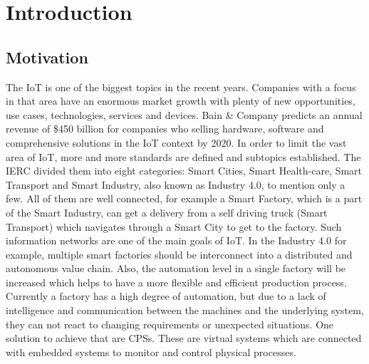 \chapter{Introduction}
\minitoc\vspace{.5cm}

\section{Motivation}

The \ac{IoT} is one of the biggest topics in the recent years.
Companies with a focus in that area have an enormous market growth with plenty of new opportunities, use cases, technologies, services and devices.
Bain \& Company predicts an annual revenue of \$450 billion for companies who selling hardware, software and comprehensive solutions in the \ac{IoT} context by 2020.\autocite{Bosche:2016}
In order to limit the vast area of \ac{IoT}, more and more standards are defined and subtopics established.
The \ac{IERC} divided them into eight categories: Smart Cities, Smart Health-care, Smart Transport and Smart Industry, also known as Industry 4.0, to mention only a few.\autocite[cf.][p. 7]{IERC:2011}
All of them are well connected, for example a Smart Factory, which is a part of the Smart Industry, can get a delivery from a self driving truck (Smart Transport) which navigates through a Smart City to get to the factory.
Such information networks are one of the main goals of \ac{IoT}.
In the Industry 4.0 for example, multiple smart factories should be interconnect into a distributed and autonomous value chain.
Also, the automation level in a single factory will be increased which helps to have a more flexible and efficient production process.
Currently a factory has a high degree of automation, but due to a lack of intelligence and communication between the machines and the underlying system, they can not react to changing requirements or unexpected situations.
One solution to achieve that are \acp{CPS}.
These are virtual systems which are connected with embedded systems to monitor and control physical processes.\autocite[cf.][p. 363]{Lee:2008}
